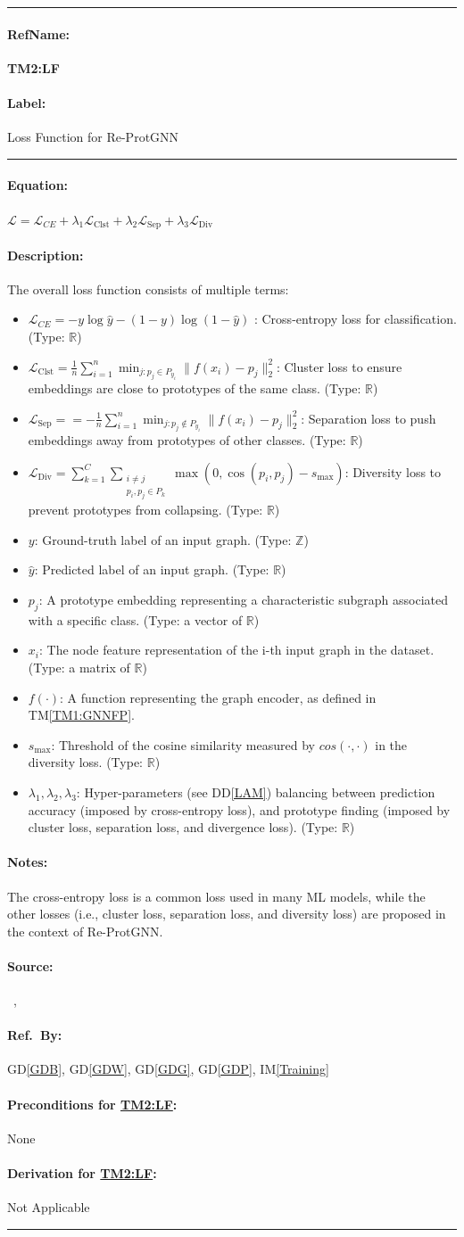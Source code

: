 \documentclass[12pt]{article}
\newcommand{\dref}[1]{GD\ref{#1}}
\newcommand{\ddref}[1]{DD\ref{#1}}
\newcommand{\tref}[1]{TM\ref{#1}}
\newcommand{\iref}[1]{IM\ref{#1}}
\newcommand{\deftheory}[9][Not Applicable]
{
\newpage
\noindent \rule{\textwidth}{0.5mm}

\paragraph{RefName: } \textbf{#2} \phantomsection 
\label{#2}

\paragraph{Label:} #3

\noindent \rule{\textwidth}{0.5mm}

\paragraph{Equation:}

#4

\paragraph{Description:}

#5

\paragraph{Notes:}

#6

\paragraph{Source:}

#7

\paragraph{Ref.\ By:}

#8

\paragraph{Preconditions for \hyperref[#2]{#2}:}
\label{#2_precond}

#9

\paragraph{Derivation for \hyperref[#2]{#2}:}
\label{#2_deriv}

#1

\noindent \rule{\textwidth}{0.5mm}

}
\begin{document}
\noindent
\deftheory
{TM2:LF}
{Loss Function for Re-ProtGNN}
{
  $\mathcal{L} = \mathcal{L}_{CE} + \lambda_1 \mathcal{L}_{\text{Clst}} + \lambda_2 \mathcal{L}_{\text{Sep}} + \lambda_3 \mathcal{L}_{\text{Div}}$
}
{
  The overall loss function consists of multiple terms:
\begin{itemize}
    \item \(\mathcal{L}_{CE} = -y \log \hat{y} - (1 - y) \log (1 - \hat{y})\) : Cross-entropy loss for classification. (Type: $\mathbb{R}$)
    \item \(\mathcal{L}_{\text{Clst}} = \frac{1}{n} \sum_{i=1}^{n} \min_{j : p_j \in P_{y_i}} \| f(x_i) - p_j \|_2^2 \): Cluster loss to ensure embeddings are close to prototypes of the same class. (Type: $\mathbb{R}$)
    \item \(\mathcal{L}_{\text{Sep}} = = -\frac{1}{n} \sum_{i=1}^{n} \min_{j : p_j \notin P_{y_i}} \| f(x_i) - p_j \|_2^2 \): Separation loss to push embeddings away from prototypes of other classes. (Type: $\mathbb{R}$)
    \item \(\mathcal{L}_{\text{Div}} = \sum_{k=1}^{C} \sum_{\substack{i \neq j \\ p_i, p_j \in P_k}} \max(0, \cos(p_i, p_j) - s_{\max})\): Diversity loss to prevent prototypes from collapsing. (Type: $\mathbb{R}$)
    \item \(y\): Ground-truth label of an input graph. (Type: $\mathbb{Z}$)
    \item \(\hat{y}\): Predicted label of an input graph. (Type: $\mathbb{R}$)
    \item \(p_j\): A prototype embedding representing a characteristic subgraph associated with a specific class. (Type: a vector of $\mathbb{R}$)
    \item \(x_i\): The node feature representation of the i-th input graph in the dataset. (Type: a matrix of $\mathbb{R}$)
    \item \(f(\cdot)\): A function representing the graph encoder, as defined in \tref{TM1:GNNFP}.
    \item \(s_{\max}\): Threshold of the cosine similarity measured by \(cos(\cdot, \cdot)\) in the diversity loss. (Type: $\mathbb{R}$)
    \item \(\lambda_1, \lambda_2, \lambda_3\): Hyper-parameters (see \ddref{LAM}) balancing between prediction accuracy (imposed by cross-entropy loss), and prototype finding (imposed by cluster loss, separation loss, and divergence loss). (Type: $\mathbb{R}$)
\end{itemize}
}
{
The cross-entropy loss is a common loss used in many ML models, while the other losses (i.e., cluster loss, separation loss, and diversity loss) are proposed in the context of Re-ProtGNN.
}
{
  ~\citep{wikipedia_crossentropy}, ~\citep{zhang2022}
}
{
  \dref{GDB}, \dref{GDW}, \dref{GDG}, \dref{GDP}, \iref{Training}
}
{
None
}
{}
\end{document}
